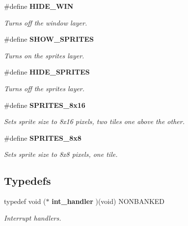 \begin{CompactItemize}
\item 
\#define {\bf HIDE\_\-WIN}
\begin{CompactList}\small\item\em Turns off the window layer.\item\end{CompactList}

\item 
\#define {\bf SHOW\_\-SPRITES}
\begin{CompactList}\small\item\em Turns on the sprites layer.\item\end{CompactList}

\item 
\#define {\bf HIDE\_\-SPRITES}
\begin{CompactList}\small\item\em Turns off the sprites layer.\item\end{CompactList}

\item 
\#define {\bf SPRITES\_\-8x16}
\begin{CompactList}\small\item\em Sets sprite size to 8x16 pixels, two tiles one above the other.\item\end{CompactList}

\item 
\#define {\bf SPRITES\_\-8x8}
\begin{CompactList}\small\item\em Sets sprite size to 8x8 pixels, one tile.\item\end{CompactList}

\end{CompactItemize}
\subsection*{Typedefs}
\begin{CompactItemize}
\item 
\label{gb.h_a100}
typedef void ($\ast$ {\bf int\_\-handler} )(void) NONBANKED
\begin{CompactList}\small\item\em Interrupt handlers.\item\end{CompactList}

\end{CompactItemize}
